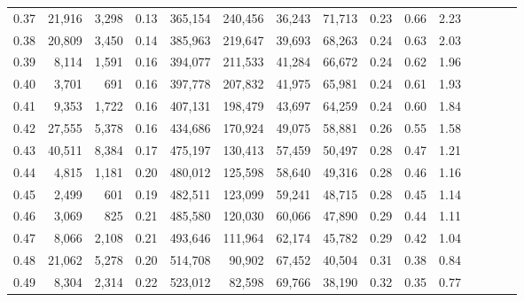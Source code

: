 \begin{tabular}{rrrcrrrrrrrrrrr}
0.37 &  21,916 &  3,298 &                                       0.13 &  365,154 &  240,456 &   36,243 &   71,713 &  0.23 &  0.66 &                         2.23 \\
0.38 &  20,809 &  3,450 &                                       0.14 &  385,963 &  219,647 &   39,693 &   68,263 &  0.24 &  0.63 &                         2.03 \\
0.39 &   8,114 &  1,591 &                                       0.16 &  394,077 &  211,533 &   41,284 &   66,672 &  0.24 &  0.62 &                         1.96 \\
0.40 &   3,701 &    691 &                                       0.16 &  397,778 &  207,832 &   41,975 &   65,981 &  0.24 &  0.61 &                         1.93 \\
0.41 &   9,353 &  1,722 &                                       0.16 &  407,131 &  198,479 &   43,697 &   64,259 &  0.24 &  0.60 &                         1.84 \\
0.42 &  27,555 &  5,378 &                                       0.16 &  434,686 &  170,924 &   49,075 &   58,881 &  0.26 &  0.55 &                         1.58 \\
0.43 &  40,511 &  8,384 &                                       0.17 &  475,197 &  130,413 &   57,459 &   50,497 &  0.28 &  0.47 &                         1.21 \\
0.44 &   4,815 &  1,181 &                                       0.20 &  480,012 &  125,598 &   58,640 &   49,316 &  0.28 &  0.46 &                         1.16 \\
0.45 &   2,499 &    601 &                                       0.19 &  482,511 &  123,099 &   59,241 &   48,715 &  0.28 &  0.45 &                         1.14 \\
0.46 &   3,069 &    825 &                                       0.21 &  485,580 &  120,030 &   60,066 &   47,890 &  0.29 &  0.44 &                         1.11 \\
0.47 &   8,066 &  2,108 &                                       0.21 &  493,646 &  111,964 &   62,174 &   45,782 &  0.29 &  0.42 &                         1.04 \\
0.48 &  21,062 &  5,278 &                                       0.20 &  514,708 &   90,902 &   67,452 &   40,504 &  0.31 &  0.38 &                         0.84 \\
0.49 &   8,304 &  2,314 &                                       0.22 &  523,012 &   82,598 &   69,766 &   38,190 &  0.32 &  0.35 &                         0.77 \\

\end{tabular}
